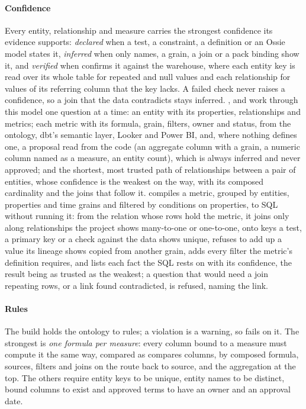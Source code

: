 \paragraph{Confidence} Every entity, relationship and measure carries the strongest confidence its
evidence supports: \emph{declared} when a test, a constraint, a definition or an Ossie model states
it, \emph{inferred} when only names, a grain, a join or a pack binding show it, and
\emph{verified} when  confirms it against the warehouse, where each entity
key is read over its whole table for repeated and null values and each relationship for values
of its referring column that the key lacks. A failed check never raises a confidence, so a join
that the data contradicts stays inferred.
,  and  work through this model
one question at a time: an entity with its properties, relationships and metrics; each metric with
its formula, grain, filters, owner and status, from the ontology, dbt's semantic layer, Looker and
Power BI, and, where nothing defines one, a proposal read from the code (an aggregate column with a
grain, a numeric column named as a measure, an entity count), which is always inferred and never
approved; and the shortest, most trusted path of relationships between a pair of entities, whose
confidence is the weakest on the way, with its composed cardinality and the joins that follow it.
 compiles a metric, grouped by entities, properties and time grains
and filtered by conditions on properties, to SQL without running it: from the relation whose rows
hold the metric, it joins only along relationships the project shows many-to-one or one-to-one, onto
keys a test, a primary key or a check against the data shows unique, refuses to add up a value its
lineage shows copied from another grain, adds every filter the metric's definition requires, and lists
each fact the SQL rests on with its confidence, the result being as trusted as the weakest; a
question that would need a join repeating rows, or a link  found
contradicted, is refused, naming the link.

\paragraph{Rules} The build holds the ontology to \ontologyRules{} rules; a violation is a warning,
so  fails on it. The strongest is \emph{one formula per measure}:
every column bound to a measure must compute it the same way, compared as  compares columns, by composed formula, sources, filters and joins on the route back to
source, and the aggregation at the top. The others require entity keys to be unique, entity names
to be distinct, bound columns to exist and approved terms to have an owner and an approval date.

